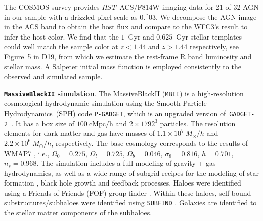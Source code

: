\documentclass{natureprintstyle}
\newcommand{\hst}{{\it HST}}
\newcommand{\lhost}{$L_{\rm host}$}
\newcommand{\sersic}{S\'ersic}
\newcommand{\reff}{{$R_{\mathrm{eff}}$}}
\newcommand{\mstar}{{$M_*$}}
\newcommand{\farcs}{\mbox{\ensuremath{.\!\!^{\prime\prime}}}}%
\newcommand{\mbii}{\texttt{MBII}}
\begin{document}
The COSMOS survey provides \hst\ ACS/F814W imaging data for 21 of 32 AGN in our sample with a drizzled pixel scale as 0\farcs03. We decompose the AGN image in the ACS band to obtain the host flux and compare to the WFC3's result to infer the host color. We find that the $1$~Gyr and $0.625$~Gyr stellar templates could well match the sample color at $z<1.44$ and $z>1.44$ respectively, see Figure~5 in D19, from which we estimate the rest-frame R band luminosity and stellar mass. A Salpeter initial mass function is employed consistently to the observed and simulated sample.



\textbf{\texttt{MassiveBlackII} simulation}.  
The MassiveBlackII (\mbii) is a high-resolution cosmological hydrodynamic simulation using the Smooth Particle Hydrodynamics~(SPH) code \texttt{P-GADGET}, which is an upgraded version of~\texttt{GADGET-2}~\cite{2005MNRAS.364.1105S}. It has a box size of $100~\mathrm{cMpc/h}$ and $2\times1792^3$ particles. The resolution elements for dark matter and gas have masses of $1.1\times 10^7~M_{\odot}/h$ and $2.2\times 10^6~M_{\odot}/h$, respectively. The base cosmology corresponds to the results of WMAP7 \cite{2011ApJS..192...18K}, i.e., $\Omega_0=0.275$, $\Omega_l=0.725$, $\Omega_b=0.046$, $\sigma_8=0.816$, $h = 0.701$, $n_s=0.968$.  The simulation includes a full modeling of gravity + gas hydrodynamics, as well as a wide range of subgrid recipes for the modeling of star formation \cite{2003MNRAS.339..289S}, black hole growth and feedback processes. Haloes were identified using a Friends-of-Friends (FOF) group finder \cite{1985ApJ...292..371D}. Within these haloes, self-bound substructures/subhaloes were identified using \texttt{SUBFIND} \cite{2005MNRAS.364.1105S}. Galaxies are identified to the stellar matter components of the subhaloes.
\end{document}
